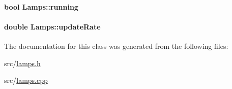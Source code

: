 \hypertarget{classLamps_a15b2fd60f5998f51d7b5e50e35c84329}{
\paragraph[{running}]{\setlength{\rightskip}{0pt plus 5cm}bool {\bf \-Lamps\-::running}}}\label{classLamps_a15b2fd60f5998f51d7b5e50e35c84329}
\hypertarget{classLamps_a31c7fbbc4d462b6b109f0c990e0e310f}{
\paragraph[{update\-Rate}]{\setlength{\rightskip}{0pt plus 5cm}double {\bf \-Lamps\-::update\-Rate}}}\label{classLamps_a31c7fbbc4d462b6b109f0c990e0e310f}


\-The documentation for this class was generated from the following files\-:\begin{DoxyCompactItemize}
\item 
src/\hyperlink{lamps_8h}{lamps.\-h}\item 
src/\hyperlink{lamps_8cpp}{lamps.\-cpp}\end{DoxyCompactItemize}
